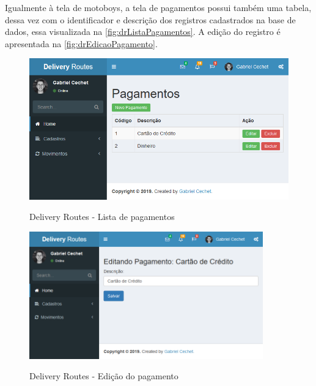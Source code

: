 \newpage
Igualmente à tela de motoboys, a tela de pagamentos possui também uma tabela, dessa vez com o identificador e descrição dos registros cadastrados na base de dados, essa visualizada na \autoref{fig:drListaPagamentos}. A edição do registro é apresentada na \autoref{fig:drEdicaoPagamento}.

\begin{figure}[H]
    \centering
    \caption{Delivery Routes - Lista de pagamentos}
    \includegraphics[width=1.0\textwidth]{./dados/figuras/fig20}
    \label{fig:drListaPagamentos}
\end{figure}

\begin{figure}[H]
    \centering
    \caption{Delivery Routes - Edição do pagamento}
    \includegraphics[width=0.9\textwidth]{./dados/figuras/fig21}
    \label{fig:drEdicaoPagamento}
\end{figure}
